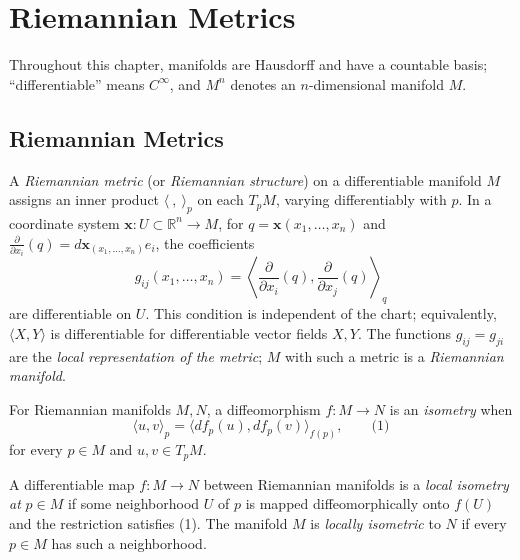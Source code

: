 \chapter{Riemannian Metrics}
\label{chap:dc-riemannian-metrics}

Throughout this chapter, manifolds are Hausdorff and have a countable basis;
``differentiable'' means $C^\infty$, and $M^n$ denotes an $n$-dimensional
manifold $M$.

\section{Riemannian Metrics}

\begin{definition}
  \label{def:dc-ch1-2-1}
  \leanok
  A \emph{Riemannian metric} (or \emph{Riemannian structure}) on a differentiable
  manifold $M$ assigns an inner product $\langle\ ,\ \rangle_p$ on each $T_pM$,
  varying differentiably with $p$. In a coordinate system
  $\mathbf{x}:U\subset\mathbb{R}^n\to M$, for
  $q=\mathbf{x}(x_1,\ldots,x_n)$ and
  $\frac{\partial}{\partial x_i}(q)=d\mathbf{x}_{(x_1,\ldots,x_n)}e_i$,
  the coefficients
  $$
  g_{ij}(x_1,\ldots,x_n)=
  \left\langle\frac{\partial}{\partial x_i}(q),
  \frac{\partial}{\partial x_j}(q)\right\rangle_q
  $$
  are differentiable on $U$. This condition is independent of the chart;
  equivalently, $\langle X,Y\rangle$ is differentiable for differentiable vector
  fields $X,Y$. The functions $g_{ij}=g_{ji}$ are the \emph{local representation
  of the metric}; $M$ with such a metric is a \emph{Riemannian manifold}.
\end{definition}

\begin{definition}[isometry]
  \label{def:dc-ch1-2-2}
  \leanok
  For Riemannian manifolds $M,N$, a diffeomorphism $f:M\to N$ is an
  \emph{isometry} when
  $$
  \langle u,v\rangle_p=\langle df_p(u),df_p(v)\rangle_{f(p)},\qquad\text{(1)}
  $$
  for every $p\in M$ and $u,v\in T_pM$.
\end{definition}

\begin{definition}
  \label{def:dc-ch1-2-3}
  \leanok
  A differentiable map $f:M\to N$ between Riemannian manifolds is a
  \emph{local isometry at} $p\in M$ if some neighborhood $U$ of $p$ is mapped
  diffeomorphically onto $f(U)$ and the restriction satisfies (1). The manifold
  $M$ is \emph{locally isometric} to $N$ if every $p\in M$ has such a neighborhood.
\end{definition}

